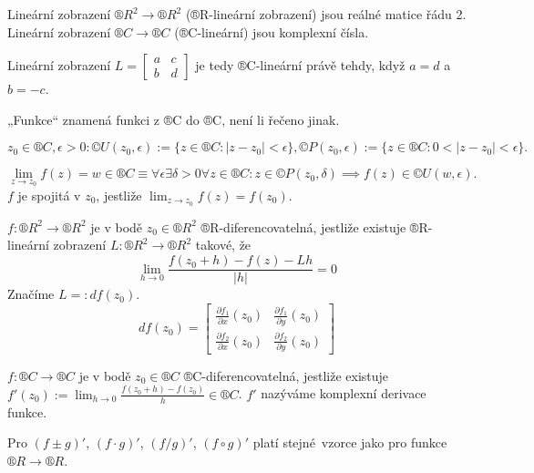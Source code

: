 \documentclass[12pt]{article}					%
\begin{document}
\begin{poznamka}
	Lineární zobrazení $®R^2 \rightarrow ®R^2$ (®R-lineární zobrazení) jsou reálné matice řádu 2. Lineární zobrazení $®C \rightarrow ®C$ (®C-lineární) jsou komplexní čísla.

	Lineární zobrazení $L = \begin{bmatrix} a & c \\ b & d \end{bmatrix}$ je tedy ®C-lineární právě tehdy, když $a = d$ a $b = -c$.
\end{poznamka}

\begin{poznamka}[Úmluva]
	„Funkce“ znamená funkci z ®C do ®C, není li řečeno jinak.
\end{poznamka}

\begin{definice}
	$$ z_0 \in ®C, \epsilon > 0: ©U(z_0, \epsilon):=\{z \in ®C: |z - z_0| < \epsilon\}, ©P(z_0, \epsilon) := \{z \in ®C: 0 < |z - z_0| < \epsilon\}. $$
\end{definice}

\begin{definice}
	$$ \lim_{z \rightarrow z_0} f(z) = w \in ®C ≡ \forall \epsilon \exists \delta > 0 \forall z \in ®C: z \in ©P(z_0, \delta) \implies f(z) \in ©U(w, \epsilon). $$
	$f$ je spojitá v $z_0$, jestliže $\lim_{z \rightarrow z_0} f(z) = f(z_0)$.
\end{definice}

\begin{definice}[Derivace]
	$f: ®R^2 \rightarrow ®R^2$ je v bodě $z_0 \in ®R^2$ ®R-diferencovatelná, jestliže existuje ®R-lineární zobrazení $L: ®R^2 \rightarrow ®R^2$ takové, že
	$$ \lim_{h \rightarrow 0} \frac{f(z_0 + h) - f(z) - Lh}{|h|} = 0 $$
	Značíme $L =: df(z_0)$.
	$$ df(z_0) = \begin{bmatrix} \frac{\partial f_1}{\partial x}(z_0) & \frac{\partial f_1}{\partial y}(z_0) \\ \frac{\partial f_2}{\partial x}(z_0) & \frac{\partial f_2}{\partial y}(z_0) \end{bmatrix}  $$

	$f: ®C \rightarrow ®C$ je v bodě $z_0 \in ®C$ ®C-diferencovatelná, jestliže existuje $f'(z_0) := \lim_{h \rightarrow 0} \frac{f(z_0 + h) - f(z_0)}{h} \in ®C$. $f'$ nazýváme komplexní derivace funkce.
\end{definice}

\begin{poznamka}
	Pro $(f±g)'$, $(f·g)'$, $(f / g)'$, $(f \circ g)'$ platí stejné vzorce jako pro funkce $®R \rightarrow ®R$.
\end{poznamka}
\end{document}
